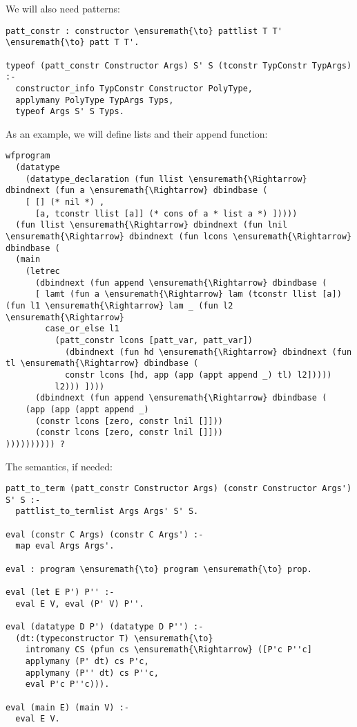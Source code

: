 We will also need patterns:

\begin{verbatim}
patt_constr : constructor \ensuremath{\to} pattlist T T' \ensuremath{\to} patt T T'.

typeof (patt_constr Constructor Args) S' S (tconstr TypConstr TypArgs) :-
  constructor_info TypConstr Constructor PolyType,
  applymany PolyType TypArgs Typs,
  typeof Args S' S Typs.
\end{verbatim}

As an example, we will define lists and their append function:

\begin{verbatim}
wfprogram
  (datatype
    (datatype_declaration (fun llist \ensuremath{\Rightarrow} dbindnext (fun a \ensuremath{\Rightarrow} dbindbase (
    [ [] (* nil *) ,
      [a, tconstr llist [a]] (* cons of a * list a *) ]))))
  (fun llist \ensuremath{\Rightarrow} dbindnext (fun lnil \ensuremath{\Rightarrow} dbindnext (fun lcons \ensuremath{\Rightarrow} dbindbase (
  (main
    (letrec
      (dbindnext (fun append \ensuremath{\Rightarrow} dbindbase (
      [ lamt (fun a \ensuremath{\Rightarrow} lam (tconstr llist [a]) (fun l1 \ensuremath{\Rightarrow} lam _ (fun l2 \ensuremath{\Rightarrow}
        case_or_else l1
          (patt_constr lcons [patt_var, patt_var])
            (dbindnext (fun hd \ensuremath{\Rightarrow} dbindnext (fun tl \ensuremath{\Rightarrow} dbindbase (
            constr lcons [hd, app (app (appt append _) tl) l2]))))
          l2))) ])))
      (dbindnext (fun append \ensuremath{\Rightarrow} dbindbase (
    (app (app (appt append _)
      (constr lcons [zero, constr lnil []]))
      (constr lcons [zero, constr lnil []]))
)))))))))) ?
\end{verbatim}

The semantics, if needed:

\begin{verbatim}
patt_to_term (patt_constr Constructor Args) (constr Constructor Args') S' S :-
  pattlist_to_termlist Args Args' S' S.

eval (constr C Args) (constr C Args') :-
  map eval Args Args'.

eval : program \ensuremath{\to} program \ensuremath{\to} prop.

eval (let E P') P'' :-
  eval E V, eval (P' V) P''.

eval (datatype D P') (datatype D P'') :-
  (dt:(typeconstructor T) \ensuremath{\to}
    intromany CS (pfun cs \ensuremath{\Rightarrow} ([P'c P''c]
    applymany (P' dt) cs P'c,
    applymany (P'' dt) cs P''c,
    eval P'c P''c))).

eval (main E) (main V) :-
  eval E V.
\end{verbatim}

